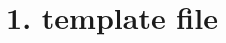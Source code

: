 \documentclass[a4paper,12pt]{article}
\title{1. template file}
\newenvironment{Section} %
\begin{document}
\maketitle

\begin{Section} %
\section{section}
section content

\subsection{subsection}
subsection content

\end{Section}
\end{document}

